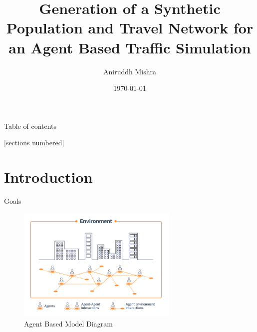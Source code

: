\documentclass[10pt, aspectratio=169]{beamer}
\title{Generation of a Synthetic Population and Travel Network for an Agent Based Traffic Simulation}
\date{\today}
\author{Aniruddh Mishra}
\institute{Institute for Computing in Research}
\begin{document}
\maketitle

\begin{frame}{Table of contents}
    \begin{adjustwidth}{3em}{-1em}
        [sections numbered]
        \begin{multicols}{2}
            \setlength{\parskip}{2em}
            \tableofcontents
        \end{multicols}
    \end{adjustwidth}
\end{frame}

\section{Introduction}

\begin{frame}[fragile]{Goals}
    \begin{center}
        \begin{figure}
            \centering
            \includegraphics[height=5.5cm, keepaspectratio]{images/agent-based-model.png}
            \caption{Agent Based Model Diagram \cite{agentbasedmodel}}
        \end{figure}
    \end{center}
\end{frame}
\end{document}
